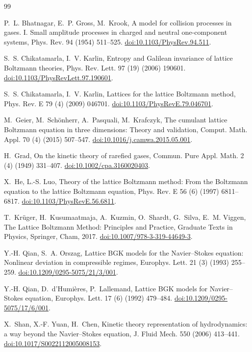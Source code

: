 \documentclass[preprint,11pt]{elsarticle}
\begin{document}
\begin{thebibliography}{99}

P.~L. Bhatnagar, E.~P. Gross, M.~Krook,
A model for collision processes in gases. I. Small amplitude processes in
charged and neutral one-component systems,
Phys. Rev. 94 (1954) 511--525.
\href{https://doi.org/10.1103/PhysRev.94.511}{doi:10.1103/PhysRev.94.511}.

S.~S. Chikatamarla, I.~V. Karlin,
Entropy and Galilean invariance of lattice Boltzmann theories,
Phys. Rev. Lett. 97 (19) (2006) 190601.
\href{https://doi.org/10.1103/PhysRevLett.97.190601}{doi:10.1103/PhysRevLett.97.190601}.

S.~S. Chikatamarla, I.~V. Karlin,
Lattices for the lattice Boltzmann method,
Phys. Rev. E 79 (4) (2009) 046701.
\href{https://doi.org/10.1103/PhysRevE.79.046701}{doi:10.1103/PhysRevE.79.046701}.

M.~Geier, M.~Sch\"onherr, A.~Pasquali, M.~Krafczyk,
The cumulant lattice Boltzmann equation in three dimensions: Theory and
validation,
Comput. Math. Appl. 70 (4) (2015) 507--547.
\href{https://doi.org/10.1016/j.camwa.2015.05.001}{doi:10.1016/j.camwa.2015.05.001}.

H.~Grad,
On the kinetic theory of rarefied gases,
Commun. Pure Appl. Math. 2 (4) (1949) 331--407.
\href{https://doi.org/10.1002/cpa.3160020403}{doi:10.1002/cpa.3160020403}.

X.~He, L.-S. Luo,
Theory of the lattice Boltzmann method: From the Boltzmann equation to the
lattice Boltzmann equation,
Phys. Rev. E 56 (6) (1997) 6811--6817.
\href{https://doi.org/10.1103/PhysRevE.56.6811}{doi:10.1103/PhysRevE.56.6811}.

T.~Kr\"uger, H.~Kusumaatmaja, A.~Kuzmin, O.~Shardt, G.~Silva, E.~M. Viggen,
The Lattice Boltzmann Method: Principles and Practice,
Graduate Texts in Physics, Springer, Cham, 2017.
\href{https://doi.org/10.1007/978-3-319-44649-3}{doi:10.1007/978-3-319-44649-3}.

Y.-H. Qian, S.~A. Orszag,
Lattice BGK models for the Navier--Stokes equation: Nonlinear deviation in
compressible regimes,
Europhys. Lett. 21 (3) (1993) 255--259.
\href{https://doi.org/10.1209/0295-5075/21/3/001}{doi:10.1209/0295-5075/21/3/001}.

Y.-H. Qian, D.~d'Humi\`eres, P.~Lallemand,
Lattice BGK models for Navier--Stokes equation,
Europhys. Lett. 17 (6) (1992) 479--484.
\href{https://doi.org/10.1209/0295-5075/17/6/001}{doi:10.1209/0295-5075/17/6/001}.

X.~Shan, X.-F. Yuan, H.~Chen,
Kinetic theory representation of hydrodynamics: a way beyond the
Navier--Stokes equation,
J. Fluid Mech. 550 (2006) 413--441.
\href{https://doi.org/10.1017/S0022112005008153}{doi:10.1017/S0022112005008153}.

\end{thebibliography}
\end{document}
